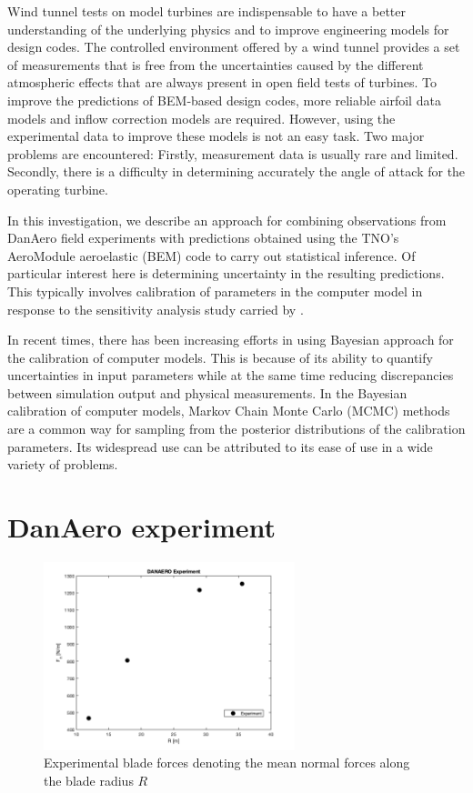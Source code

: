 \documentclass[11pt]{article}
\begin{document}
Wind tunnel tests on model turbines are indispensable to have a better understanding of the underlying physics and to improve engineering models for design codes. The controlled environment offered by a wind tunnel provides a set of measurements that is free from the uncertainties caused by the different atmospheric effects that are always present in open field tests of turbines. To improve the predictions of BEM‐based design codes, more reliable airfoil data models and inflow correction models are required. However, using the experimental data to improve these models is not an easy task. Two major problems are encountered: Firstly, measurement data is usually rare and limited. Secondly, there is a difficulty in determining accurately the angle of attack for the operating turbine.

In this investigation, we describe an approach for combining
observations from DanAero field experiments with predictions obtained using the TNO’s AeroModule aeroelastic (BEM) code  to carry out statistical
inference. Of particular interest here is determining uncertainty in the resulting predictions. This typically involves calibration of parameters in the computer model in response to the sensitivity analysis study carried by \citet{torque2020}.

In recent times, there has been increasing efforts in using Bayesian approach for the calibration of computer models. This is because of its ability to quantify uncertainties in input parameters while at the
same time reducing discrepancies between simulation
output and physical measurements. In the Bayesian
calibration of computer models, Markov Chain
Monte Carlo (MCMC) methods are a common way
for sampling from the posterior distributions of the
calibration parameters. Its widespread use can be
attributed to its ease of use in a wide variety of
problems. 


\section{DanAero experiment}

\begin{figure}
\centering
\includegraphics[width=0.65\textwidth]{exp.png}
\caption{Experimental blade forces denoting the mean normal forces along the blade radius $R$}
\label{pt1}
\end{figure}
\end{document}
